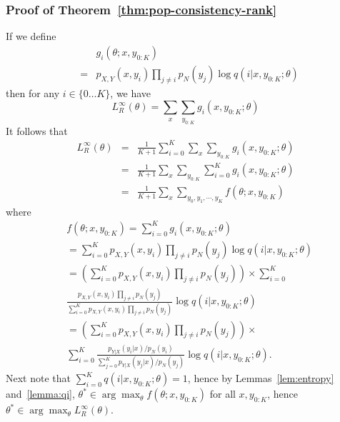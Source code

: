 \documentclass[11pt,a4paper]{article}
\begin{document}
\subsubsection{Proof of Theorem~\ref{thm:pop-consistency-rank}}
\label{sec:pf-pop-consis-ranking}
If we define 
\begin{eqnarray*}
&&g_i(\theta; x, y_{0:K})\\ 
&=& p_{X, Y}(x, y_i) \prod_{j \neq i} p_N(y_j) \log
q(i | x, y_{0:K}; \theta) 
\end{eqnarray*}
then for any $i \in \{0 \ldots K\}$,
we have
\[
L_R^\infty\left(\theta\right) = \sum_{x}\sum_{y_{0:K}} g_i(x, y_{0:K}; \theta)
\]
It follows that 
\begin{eqnarray*}
L_R^\infty\left(\theta\right) 
&=& \frac{1}{K+1} \sum_{i=0}^K \sum_{x}\sum_{y_{0:K}} g_i(x, y_{0:K}; \theta)\\
&=& \frac{1}{K+1} \sum_{x}\sum_{y_{0:K}} \sum_{i=0}^K g_i(x, y_{0:K}; \theta)\\
&=& \frac{1}{K+1}\sum_{x}\sum_{y_0,
  y_1,\cdots, y_K}f(\theta ; x, y_{0:K}) 
\end{eqnarray*}
where
\begin{equation*}
\begin{aligned}
& f(\theta; x, y_{0:K}) = \sum_{i=0}^K g_i(x, y_{0:K}; \theta)\\
& = \sum_{i=0}^K p_{X, Y}(x, y_i)\prod_{j\neq i} p_N(y_j) \log q(i | x, y_{0:K}; \theta)\\
& = \left(\sum_{i=0}^K p_{X, Y}(x, y_i)\prod_{j\neq i} p_N(y_j)\right) \times \sum_{i=0}^K \\
&\frac{p_{X, Y}(x, y_i)\prod_{j\neq i} p_N(y_j)}{\sum_{i=0}^K p_{X, Y}(x, y_i)\prod_{j\neq i} p_N(y_j)} \log q(i | x, y_{0:K}; \theta)\\
& = \left(\sum_{i=0}^K p_{X, Y}(x, y_i)\prod_{j\neq i} p_N(y_j)\right) \times \\
& \sum_{i=0}^K \frac{p_{Y|X}(y_i|x) / p_N(y_i)}{\sum_{j=0}^K p_{Y|X}(y_j|x) / p_N(y_j)} \log q(i | x, y_{0:K}; \theta).  
\end{aligned}
\end{equation*}
Next note that $\sum_{i=0}^K q(i | x, y_{0:K}; \theta) = 1$, hence by
Lemmas~\ref{lem:entropy} and~\ref{lemma:qi}, $\theta^* \in
\arg\max_{\theta} f(\theta; x, y_{0:K})$ for all $x, y_{0:K}$, hence
$\theta^* \in \arg\max_{\theta} L^{\infty}_R(\theta)$.
\end{document}
